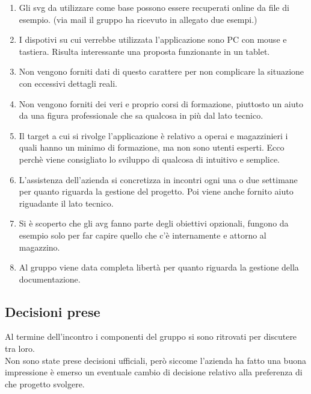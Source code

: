 \begin{enumerate}
    \item Gli svg da utilizzare come base possono essere recuperati online da file di esempio. (via mail il gruppo ha ricevuto in allegato due esempi.)
    \item I dispotivi su cui verrebbe utilizzata l'applicazione sono PC con mouse e tastiera. Risulta interessante una proposta funzionante in un tablet.
    \item Non vengono forniti dati di questo carattere per non complicare la situazione con eccessivi dettagli reali.
    \item Non vengono forniti dei veri e proprio corsi di formazione, piuttosto un aiuto da una figura professionale che sa qualcosa in più dal lato tecnico.
    \item Il target a cui si rivolge l'applicazione è relativo a operai e magazzinieri i quali hanno un minimo di formazione, ma non sono utenti esperti. Ecco perchè viene consigliato lo sviluppo di qualcosa di intuitivo e semplice.
    \item L'assistenza dell'azienda si concretizza in incontri ogni una o due settimane per quanto riguarda la gestione del progetto. Poi viene anche fornito aiuto riguadante il lato tecnico.
    \item Si è scoperto che gli avg fanno parte degli obiettivi opzionali, fungono da esempio solo per far capire quello che c'è internamente e attorno al magazzino.
    \item Al gruppo viene data completa libertà per quanto riguarda la gestione della documentazione. \\
\end{enumerate}

\subsection{Decisioni prese}
Al termine dell'incontro i componenti del gruppo si sono ritrovati per discutere tra loro.\\
Non sono state prese decisioni ufficiali, però siccome l'azienda ha fatto una buona impressione è emerso un eventuale cambio di decisione relativo alla preferenza di che progetto svolgere.
